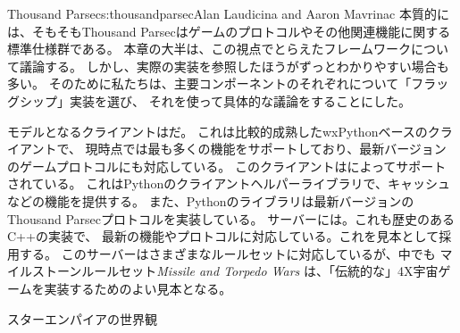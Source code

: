 \begin{aosachapter}{Thousand Parsec}{s:thousandparsec}{Alan Laudicina and Aaron Mavrinac}
本質的には、そもそもThousand Parsecはゲームのプロトコルやその他関連機能に関する標準仕様群である。
本章の大半は、この視点でとらえたフレームワークについて議論する。
しかし、実際の実装を参照したほうがずっとわかりやすい場合も多い。
そのために私たちは、主要コンポーネントのそれぞれについて「フラッグシップ」実装を選び、
それを使って具体的な議論をすることにした。

モデルとなるクライアントはだ。
これは比較的成熟したwxPythonベースのクライアントで、
現時点では最も多くの機能をサポートしており、最新バージョンのゲームプロトコルにも対応している。
このクライアントはによってサポートされている。
これはPythonのクライアントヘルパーライブラリで、キャッシュなどの機能を提供する。
また、Pythonのライブラリは最新バージョンのThousand Parsecプロトコルを実装している。
サーバーには。これも歴史のあるC++の実装で、
最新の機能やプロトコルに対応している。これを見本として採用する。
このサーバーはさまざまなルールセットに対応しているが、中でも
マイルストーンルールセット\emph{Missile and Torpedo Wars}
は、「伝統的な」4X宇宙ゲームを実装するためのよい見本となる。

\begin{aosasect1}{スターエンパイアの世界観}


\end{aosasect1}
\end{aosachapter}
